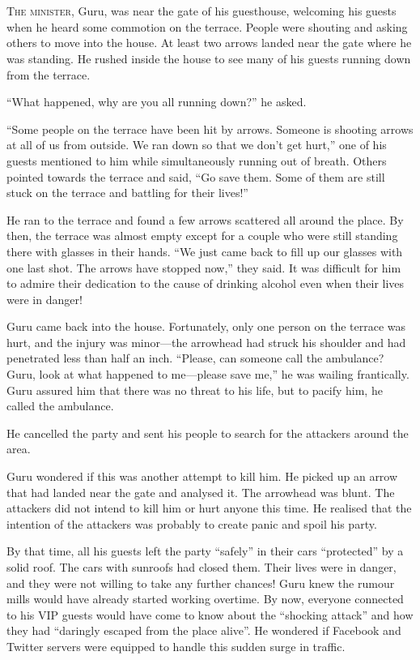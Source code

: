 \chapter{}

\lettrine{T}{he minister}, Guru, was near the gate of his guesthouse, welcoming his guests
when he heard some commotion on the terrace. People were shouting and asking
others to move into the house. At least two arrows landed near the gate where he
was standing. He rushed inside the house to see many of his guests running down
from the terrace.

“What happened, why are you all running down?” he asked.

“Some people on the terrace have been hit by arrows. Someone is shooting arrows
at all of us from outside. We ran down so that we don't get hurt,” one of his
guests mentioned to him while simultaneously running out of breath. Others
pointed towards the terrace and said, “Go save them. Some of them are still
stuck on the terrace and battling for their lives!”

He ran to the terrace and found a few arrows scattered all around the place. By
then, the terrace was almost empty except for a couple who were still standing there
with glasses in their hands. “We just came back to fill up our glasses with one
last shot. The arrows have stopped now,” they said. It was difficult for him to
admire their dedication to the cause of drinking alcohol even when their lives
were in danger!

Guru came back into the house. Fortunately, only one person on the terrace was
hurt, and the injury was minor—the arrowhead had struck his shoulder and
had penetrated less than half an inch. “Please, can someone call the
ambulance? Guru, look at what happened to me—please save me,” he was wailing
frantically. Guru assured him that there was no threat to his life, but to pacify
him, he called the ambulance.

He cancelled the party and sent his people to search for the attackers around the
area.

Guru wondered if this was another attempt to kill him. He picked up an arrow
that had landed near the gate and analysed it. The arrowhead was blunt. The
attackers did not intend to kill him or hurt anyone this time. He realised that
the intention of the attackers was probably to create panic and spoil his party.

By that time, all his guests left the party “safely” in their cars “protected” by
a solid roof. The cars with sunroofs had closed them. Their lives were
in danger, and they were not willing to take any further chances! Guru knew the
rumour mills would have already started working overtime. By now, everyone
connected to his VIP guests would have come to know about the “shocking attack”
and how they had “daringly escaped from the place alive”. He wondered if
Facebook and Twitter servers were equipped to handle this sudden surge in
traffic.

